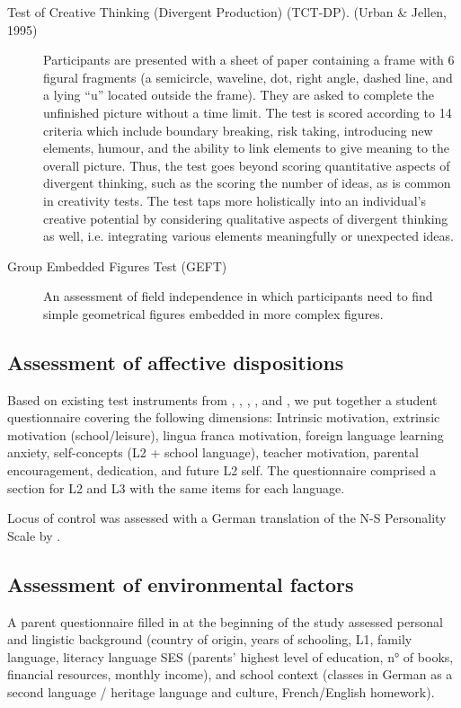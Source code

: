 \documentclass[output=paper]{langsci/langscibook}
\begin{document}
\begin{description}
\item[Test of Creative Thinking (Divergent Production) (TCT-DP). (Urban \& Jellen, 1995)]

Participants are presented with a sheet of paper containing a frame with 6 figural fragments (a semicircle, waveline, dot, right angle, dashed line, and a lying “u” located outside the frame). They are asked to complete the unfinished picture without a time limit. The test is scored according to 14 criteria which include boundary breaking, risk taking, introducing new elements, humour, and the ability to link elements to give meaning to the overall picture. Thus, the test goes beyond scoring quantitative aspects of divergent thinking, such as the scoring the number of ideas, as is common in creativity tests. The test taps more holistically into an individual’s creative potential by considering qualitative aspects of divergent thinking as well, i.e. integrating various elements meaningfully or unexpected ideas.

\item[Group Embedded Figures Test (GEFT)]
An assessment of field independence \citep{WitkinEtAl2014} in which participants need to find simple geometrical figures embedded in more complex figures.
\end{description}

\subsection{Assessment of affective dispositions}
Based on existing test instruments from \citet{HorwitzEtAl1986}, \citet{Stoeckli2004}, \citet{Doernyei2010}, \citet{Heinzmann2013}, and \citet{PeyerEtAl2016}, we put together a student questionnaire covering the following dimensions: Intrinsic motivation, extrinsic motivation (school/leisure), lingua franca motivation, foreign language learning anxiety, self-concepts (L2 + school language), teacher motivation, parental encouragement, dedication, and future L2 self. The questionnaire comprised a section for L2 and L3 with the same items for each language. 

Locus of control was assessed with a German translation of the N-S Personality Scale by \citet{NowickiStrickland1973}.

\subsection{Assessment of environmental factors}
A parent questionnaire filled in at the beginning of the study assessed personal and lingistic background (country of origin, years of schooling, L1, family language, literacy language SES (parents’ highest level of education, n° of books, financial resources, monthly income), and school context (classes in German as a second language / heritage language and culture, French/English homework).
\end{document}
